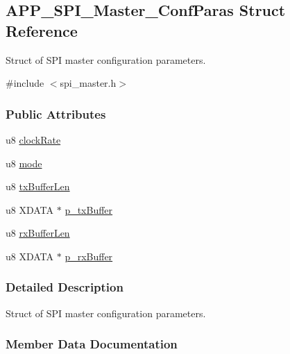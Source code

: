 \hypertarget{struct_a_p_p___s_p_i___master___conf_paras}{}\subsection{A\+P\+P\+\_\+\+S\+P\+I\+\_\+\+Master\+\_\+\+Conf\+Paras Struct Reference}
\label{struct_a_p_p___s_p_i___master___conf_paras}


Struct of S\+PI master configuration parameters.  




{\ttfamily \#include $<$spi\+\_\+master.\+h$>$}

\subsubsection*{Public Attributes}
\begin{DoxyCompactItemize}
\item 
u8 \hyperlink{struct_a_p_p___s_p_i___master___conf_paras_a3b6375923c7ef7374f70363196c7b0e9}{clock\+Rate}
\item 
u8 \hyperlink{struct_a_p_p___s_p_i___master___conf_paras_a6e8104cf66cbec77d6b55703544ee819}{mode}
\item 
u8 \hyperlink{struct_a_p_p___s_p_i___master___conf_paras_ae5c426e92642336228c5d5dfebaf81c5}{tx\+Buffer\+Len}
\item 
u8 X\+D\+A\+TA $\ast$ \hyperlink{struct_a_p_p___s_p_i___master___conf_paras_a0a4aadeca7214fca5e4bac58db4e8918}{p\+\_\+tx\+Buffer}
\item 
u8 \hyperlink{struct_a_p_p___s_p_i___master___conf_paras_a81b4eda9480a6dafa35b107cd46910d3}{rx\+Buffer\+Len}
\item 
u8 X\+D\+A\+TA $\ast$ \hyperlink{struct_a_p_p___s_p_i___master___conf_paras_a0e95780b386acd2174635297cb57e2da}{p\+\_\+rx\+Buffer}
\end{DoxyCompactItemize}


\subsubsection{Detailed Description}
Struct of S\+PI master configuration parameters. 

\subsubsection{Member Data Documentation}
